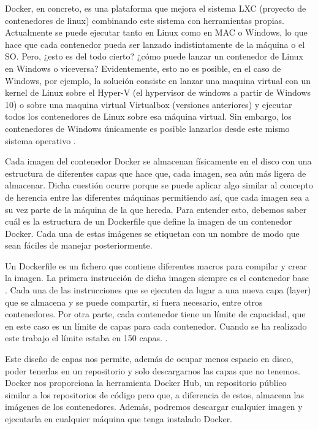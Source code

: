Docker, en concreto, es una plataforma que mejora el sistema LXC (proyecto
de contenedores de linux) combinando este sistema con herramientas propias.
Actualmente se puede ejecutar tanto en Linux como en MAC o Windows, lo que
hace que cada contenedor pueda ser lanzado indistintamente de la máquina o
el SO. Pero, ¿esto es del todo cierto? ¿cómo puede lanzar un contenedor de
Linux en Windows o viceversa? Evidentemente, esto no es posible, en el caso
de Windows, por ejemplo, la solución consiste en lanzar una maquina virtual
con un kernel de Linux sobre el Hyper-V (el hypervisor de windows a partir
de Windows 10) o sobre una maquina virtual Virtualbox (versiones
anteriores) y ejecutar todos los contenedores de Linux sobre esa máquina
virtual. Sin embargo, los contenedores de Windows únicamente es posible
lanzarlos desde este mismo sistema operativo \cite{Dck-10}.

Cada imagen del contenedor Docker se almacenan físicamente en el disco con
una estructura de diferentes capas que hace que, cada imagen, sea aún más
ligera de almacenar. Dicha cuestión ocurre porque se puede aplicar algo
similar al concepto de herencia entre las diferentes máquinas permitiendo
así, que cada imagen sea a su vez parte de la máquina de la que hereda.
Para entender esto, debemos saber cuál es la estructura de un Dockerfile
que define la imagen de un contenedor Docker. Cada una de estas imágenes se
etiquetan con un nombre de modo que sean fáciles de manejar posteriormente.

Un Dockerfile es un fichero que contiene diferentes macros para compilar y
crear la imagen. La primera instrucción de dicha imagen siempre es el
contenedor base \cite{Dck-11}. Cada una de las instrucciones que se
ejecuten da lugar a una nueva capa (layer) que se almacena y se puede
compartir, si fuera necesario, entre otros contenedores. Por otra parte,
cada contenedor tiene un límite de capacidad, que en este caso es un límite
de capas para cada contenedor. Cuando se ha realizado este trabajo el
límite estaba en 150 capas. \cite{Dck-12}.

Este diseño de capas nos permite, además de ocupar menos espacio en disco,
poder tenerlas en un repositorio y solo descargarnos las capas que no
tenemos. Docker nos proporciona la herramienta Docker Hub, un repositorio
público similar a los repositorios de código pero que, a diferencia de
estos, almacena las imágenes de los contenedores. Además, podremos
descargar cualquier imagen y ejecutarla en cualquier máquina que tenga
instalado Docker.

